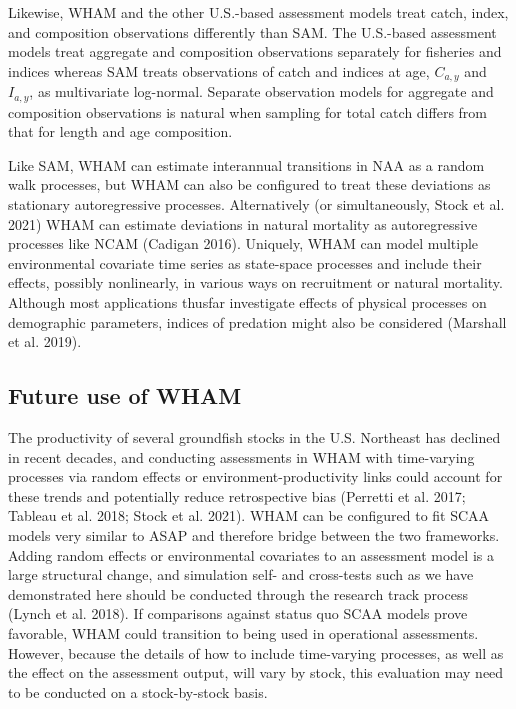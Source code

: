 \documentclass[]{article}
\begin{document}
Likewise, WHAM and the other U.S.-based assessment models treat catch,
index, and composition observations differently than SAM. The U.S.-based
assessment models treat aggregate and composition observations
separately for fisheries and indices whereas SAM treats observations of
catch and indices at age, \(C_{a,y}\) and \(I_{a,y}\), as multivariate
log-normal. Separate observation models for aggregate and composition
observations is natural when sampling for total catch differs from that
for length and age composition.

Like SAM, WHAM can estimate interannual transitions in NAA as a random
walk processes, but WHAM can also be configured to treat these
deviations as stationary autoregressive processes. Alternatively (or
simultaneously, Stock et al. 2021) WHAM can estimate deviations in
natural mortality as autoregressive processes like NCAM (Cadigan 2016).
Uniquely, WHAM can model multiple environmental covariate time series as
state-space processes and include their effects, possibly nonlinearly,
in various ways on recruitment or natural mortality. Although most
applications thusfar investigate effects of physical processes on
demographic parameters, indices of predation might also be considered
(Marshall et al. 2019).

\hypertarget{future-use-of-wham}{%
\subsection{Future use of WHAM}\label{future-use-of-wham}}

The productivity of several groundfish stocks in the U.S. Northeast has
declined in recent decades, and conducting assessments in WHAM with
time-varying processes via random effects or environment-productivity
links could account for these trends and potentially reduce
retrospective bias (Perretti et al. 2017; Tableau et al. 2018; Stock et
al. 2021). WHAM can be configured to fit SCAA models very similar to
ASAP and therefore bridge between the two frameworks. Adding random
effects or environmental covariates to an assessment model is a large
structural change, and simulation self- and cross-tests such as we have
demonstrated here should be conducted through the research track process
(Lynch et al. 2018). If comparisons against status quo SCAA models prove
favorable, WHAM could transition to being used in operational
assessments. However, because the details of how to include time-varying
processes, as well as the effect on the assessment output, will vary by
stock, this evaluation may need to be conducted on a stock-by-stock
basis.
\end{document}
